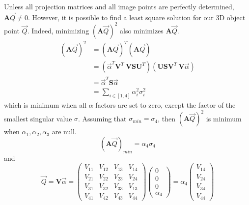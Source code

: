\begin{algorithm}
      \begin{algorithmic}[1]
      \STATE Unless all projection matrices and all image points are perfectly determined, \(\textbf{A}\overrightarrow{Q} \neq 0\). However, it is possible to find a least square solution for our 3D object point \(\overrightarrow{Q}\). Indeed, minimizing \((\textbf{A}\overrightarrow{Q})^2\) also minimizes \(\textbf{A}\overrightarrow{Q}\).
      \begin{equation}
          \begin{aligned}
          (\textbf{A}\overrightarrow{Q})^2 & = (\textbf{A} \overrightarrow{Q})^T (\textbf{A} \overrightarrow{Q})\\
          & = (\overrightarrow{\alpha}^T \textbf{V}^T \ \textbf{V} \textbf{S} \textbf{U}^T)(\textbf{U} \textbf{S} \textbf{V}^T \ \textbf{V}\overrightarrow{\alpha})\\
          & = \overrightarrow{\alpha}^T \textbf{S} \overrightarrow{\alpha}\\
          & = \sum_{i \in [1,4]} \alpha_i^2 \sigma_i^2
          \end{aligned}
      \end{equation}
      which is minimum when all \(\alpha\) factors are set to zero, except the factor of the smallest singular value \(\sigma\). 
      \STATE Assuming that \(\sigma_{min} = \sigma_4\), then \((\textbf{A}\overrightarrow{Q})^2\) is minimum when \(\alpha_1, \alpha_2, \alpha_3\) are null.
      \begin{equation}
          (\textbf{A} \overrightarrow{Q})_{min} = \alpha_4 \sigma_4
      \end{equation}
      and 
      \begin{equation}
          \overrightarrow{Q} = 
          \textbf{V} \overrightarrow{\alpha} 
          = \begin{pmatrix}V_{11} & V_{12} & V_{13} & V_{14} \\
          V_{21} & V_{22} & V_{23} & V_{24} \\
          V_{31} & V_{32} & V_{33} & V_{13} \\
          V_{41} & V_{42} & V_{43} & V_{44}\end{pmatrix} \begin{pmatrix}0 \\0 \\0 \\\alpha_4\end{pmatrix} 
          = \alpha_4 \begin{pmatrix}V_{14} \\V_{24} \\V_{34} \\V_{44}\end{pmatrix} 

\end{equation}
\end{algorithmic}
\end{algorithm}
